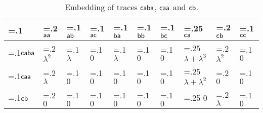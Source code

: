 \begin{table*}[t!]
	\vspace{+0.5cm}
	\caption{Embedding of traces $\mathsf{caba}$, $\mathsf{caa}$ and $\mathsf{cb}$.}\label{tb:embedding}
	\vspace{-0.4cm}
	\begin{center}
		{
			\begin{tabularx}{\textwidth}{
					>{\hsize=.1\hsize}X
					>{\hsize=.2\hsize}X
					>{\hsize=.1\hsize}X
					>{\hsize=.1\hsize}X
					>{\hsize=.1\hsize}X
					>{\hsize=.1\hsize}X
					>{\hsize=.1\hsize}X
					>{\hsize=.25\hsize}X
					>{\hsize=.2\hsize}X
					>{\hsize=.1\hsize}X
				}
				\toprule
				& $\mathsf{aa}$    & $\mathsf{ab}$   & $\mathsf{ac}$    & $\mathsf{ba}$   & $\mathsf{bb}$   & $\mathsf{bc}$ & $\mathsf{ca}$ & $\mathsf{cb}$ & $\mathsf{cc}$   \\
				\midrule
				$\mathsf{caba}$ & $\lambda^2$ & $\lambda$ & $0$ & $\lambda$  & $0$  & $0$ & $\lambda+\lambda^3$ & $\lambda^2$ & $0$\\
				$\mathsf{caa}$  & $\lambda$ & $0$ & $0$ & $0$ & $0$ & $0$ & $\lambda+\lambda^2$ & $0$&  $0$\\
				$\mathsf{cb}$   & $0$ & $0$ & $0$ & $0$ & $0$ & $0$ & $0$ & $\lambda$& $0$ \\
				\bottomrule
			\end{tabularx}
		}
		\vspace{-0.3cm}
	\end{center}
\end{table*}
